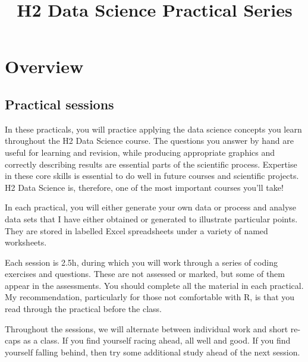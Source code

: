 \documentclass[
  11pt,
  a4paper,
]{book}
\title{H2 Data Science Practical Series}
\author{}
\date{\vspace{-2.5em}}
\let\oldmaketitle\maketitle
\begin{document}
\maketitle



\let\maketitle\oldmaketitle


{
\hypersetup{linkcolor=}
\setcounter{tocdepth}{0}
\tableofcontents
}
\hypertarget{overview}{%
\chapter*{Overview}\label{overview}}

\hypertarget{practical-sessions}{%
\section{Practical sessions}\label{practical-sessions}}

In these practicals, you will practice applying the data science concepts you learn throughout the H2 Data Science course. The questions you answer by hand are useful for learning and revision, while producing appropriate graphics and correctly describing results are essential parts of the scientific process. Expertise in these core skills is essential to do well in future courses and scientific projects. H2 Data Science is, therefore, one of the most important courses you'll take!

In each practical, you will either generate your own data or process and analyse data sets that I have either obtained or generated to illustrate particular points. They are stored in labelled Excel spreadsheets under a variety of named worksheets.

Each session is 2.5h, during which you will work through a series of coding exercises and questions. These are not assessed or marked, but some of them appear in the assessments. You should complete all the material in each practical. My recommendation, particularly for those not comfortable with R, is that you read through the practical before the class.

Throughout the sessions, we will alternate between individual work and short re-caps as a class. If you find yourself racing ahead, all well and good. If you find yourself falling behind, then try some additional study ahead of the next session.
\end{document}
